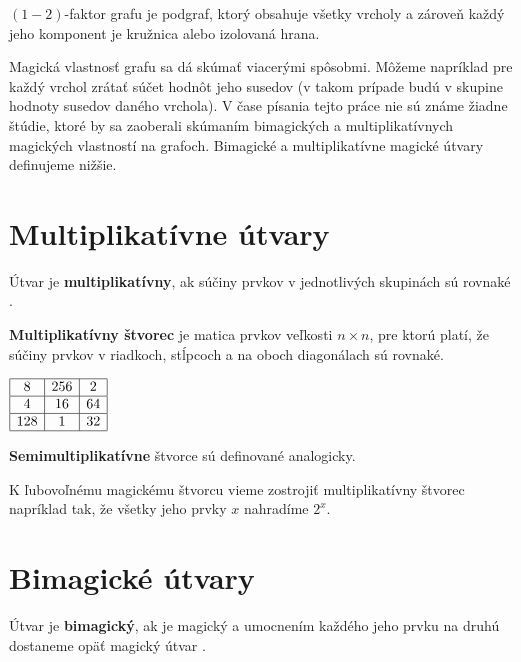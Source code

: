 \begin{note} $(1-2)$-faktor grafu je podgraf, ktorý obsahuje všetky vrcholy a zároveň každý jeho komponent je kružnica alebo izolovaná hrana. 
\end{note} 

Magická vlastnosť grafu sa dá skúmať viacerými spôsobmi. Môžeme napríklad pre každý vrchol zrátať súčet hodnôt jeho susedov (v takom prípade budú v skupine hodnoty susedov daného vrchola). V čase písania tejto práce nie sú známe žiadne štúdie, ktoré by sa zaoberali skúmaním bimagických a multiplikatívnych magických vlastností na grafoch. Bimagické a multiplikatívne magické útvary definujeme nižšie.

\section{Multiplikatívne útvary}
\begin{definition} Útvar je \textbf{multiplikatívny}, ak súčiny prvkov v jednotlivých skupinách sú rovnaké \cite{multimagie}.
\end{definition}

\begin{definition} \textbf{Multiplikatívny štvorec} je matica prvkov veľkosti $n \times n$, pre ktorú platí, že súčiny prvkov v riadkoch, stĺpcoch a na oboch diagonálach sú rovnaké.
\end{definition}

\begin{center}
$\begin{array}{ |c|c|c| } 
\hline
8 & 256 & 2 \\ 
\hline
4 & 16 & 64 \\ 
\hline
128 & 1 & 32 \\
\hline
\end{array}$
\end{center}

\begin{note} \textbf{Semimultiplikatívne} štvorce sú definované analogicky.
\end{note}

K ľubovoľnému magickému štvorcu vieme zostrojiť multiplikatívny štvorec napríklad tak, že všetky jeho prvky $x$ nahradíme $2^x$.

\section{Bimagické útvary}
\begin{definition} Útvar je \textbf{bimagický}, ak je magický a umocnením každého jeho prvku na druhú dostaneme opäť magický útvar \cite{multimagie}.
\end{definition}

